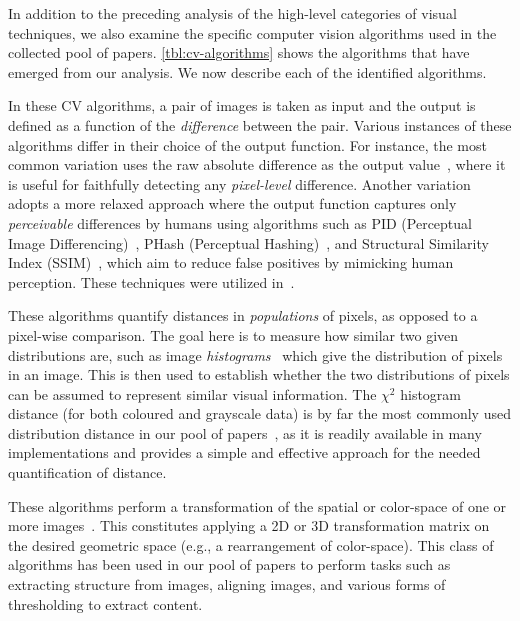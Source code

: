 In addition to the preceding analysis of the high-level categories of visual techniques,
we also examine the specific computer vision algorithms used in the collected pool of papers.
\autoref{tbl:cv-algorithms} shows the algorithms that have emerged from our analysis.
We now describe each of the identified algorithms.

In these CV algorithms,
a pair of images is taken as input
and the output is defined as a function of the \emph{difference}  between the pair.
Various instances of these algorithms differ in their choice of the output function.
For instance, the most common variation uses the raw absolute difference as the output value~\cite{Choudhary-2010-ICSM,Li-2010-CHI,Mahajan-2014-ASE,Ponzanelli-2016-ICSE,
Deka-2017-UIST,Bao-2017-EMSE,Chen-2017-IUI,Kirac-2018-JSS,Moran-ICSE-2018},
where it is useful for faithfully detecting any \textit{pixel-level} difference.
Another variation adopts a more relaxed approach
where the output function captures only \emph{perceivable} differences by humans
using algorithms such as PID (Perceptual Image Differencing)~\cite{ref:PID},
PHash (Perceptual Hashing)~\cite{ref:PHash},
and Structural Similarity Index (SSIM)~\cite{ref:SSIM},
which aim to reduce false positives by mimicking human perception.
These techniques were utilized in~\cite{Mahajan-2015-ICST,Mahajan-2016-ICST,
Xu-2018-TOIT,Moran-ICSE-2018,Moran-2018-ASE,Burg-2015-UIST}. 

These algorithms quantify distances in \emph{populations} of pixels,
as opposed to a pixel-wise comparison.
The goal here is to measure how similar two given distributions are,
such as image \emph{histograms}~\cite{223129} which give the distribution of pixels in an image.
This is then used to establish whether the two
distributions of pixels can be assumed to represent similar visual
information.
The $\chi^2$ histogram distance (for both coloured and grayscale data)
is by far the most commonly used distribution distance
in our pool of papers~\cite{Choudhary-2012-ICST,Choudhary-2013-ICSE,
Hori-2015-SEKE,Feng-2016-ASE,He-2016-ICWS, Moran-2018-ASE},
as it is readily available in many implementations
and provides a simple and effective approach for the needed quantification of distance.

These algorithms perform a transformation
of the spatial or color-space of one or more images~\cite{Li-2010-CHI,Patric-2016-ASE,Wan-2017-STVR,Kirac-2018-JSS,
canvas_icst2018,Moran-TSE-2018,Moran-ICSE-2018,Xiao-2019-ICSE}.
This constitutes applying a 2D or 3D transformation matrix
on the desired geometric space (e.g., a rearrangement of color-space).
This class of algorithms has been used in our pool of papers
to perform tasks such as extracting structure from images,
aligning images, and various forms of thresholding to extract content.

